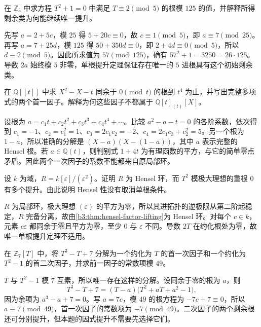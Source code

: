 \begin{optionalexercise}\label{b3:ex:23-five-adic-root}
	在 \(\mathbb Z_5\) 中求方程 \(T^2+1=0\) 中满足 \(T\equiv2\pmod5\) 的根模 \(125\) 的值，并解释所得剩余类为何能继续唯一提升。
\end{optionalexercise}
\begin{solution}
	先写 \(a=2+5c\)，模 \(25\) 得 \(5+20c\equiv0\)，故 \(c\equiv1\pmod5\)，即 \(a\equiv7\pmod{25}\)。再写 \(a=7+25d\)，模 \(125\) 得 \(50+350d\equiv0\)，即 \(2+4d\equiv0\pmod5\)，所以 \(d\equiv2\pmod5\)。因此所求值为 \(57\pmod{125}\)，确有 \(57^2+1=3250=26\cdot125\)。导数 \(2a\) 始终模 \(5\) 非零，单根提升定理保证存在唯一的 \(5\) 进根具有这个初始剩余类。
\end{solution}

\begin{optionalexercise}\label{b3:ex:23-series-root-factors}
	在 \(\mathbb Q[\![t]\!]\) 中求 \(X^2-X-t\) 同余于 \(0\pmod t\) 的根到 \(t^4\) 为止，并写出完整多项式的两个首一因子。解释为何这些因子不都属于 \(\mathbb Q[t]_{(t)}[X]\)。
\end{optionalexercise}
\begin{solution}
	设根为 \(a=c_1t+c_2t^2+c_3t^3+c_4t^4+\cdots\)。比较 \(a^2-a-t=0\) 的各阶系数，依次得到 \(c_1=-1\)、\(c_2=c_1^2=1\)、\(c_3=2c_1c_2=-2\)、\(c_4=2c_1c_3+c_2^2=5\)。另一个根为 \(1-a\)，所以准确的分解是 \((X-a)(X-(1-a))\)，其中 \(a\) 表示完整的 Hensel 根。若 \(a\in\mathbb Q(t)\)，则判别式 \(1+4t\) 为有理函数的平方，与它的简单零点矛盾。因此两个一次因子的系数不能都来自原局部环。
\end{solution}

\begin{optionalexercise}\label{b3:ex:23-repeated-root-henselian}
	设 \(k\) 为域，\(R=k[\varepsilon]/(\varepsilon^2)\)。证明 \(R\) 为 Hensel 环，而 \(T^2\) 模极大理想的重根 \(0\) 有多个提升。由此说明 Hensel 性没有取消单根条件。
\end{optionalexercise}
\begin{solution}
	\(R\) 为局部环，极大理想 \((\varepsilon)\) 的平方为零，所以其进拓扑的逆极限从第二阶起稳定，\(R\) 完备分离，故由\cref{b3:thm:hensel-factor-lifting}为 Hensel 环。对每个 \(c\in k\)，元素 \(c\varepsilon\) 都同余于零且平方为零，至少 \(0\) 与 \(\varepsilon\) 不同。导数 \(2T\) 在约化根处为零，故唯一单根提升定理不适用。
\end{solution}

\begin{optionalexercise}\label{b3:ex:23-cubic-hensel-factor}
	在 \(\mathbb Z_7[T]\) 中，将 \(T^3-T+7\) 分解为一个约化为 \(T\) 的首一次因子和一个约化为 \(T^2-1\) 的首二次因子，并求前一因子的常数项模 \(49\)。
\end{optionalexercise}
\begin{solution}
	\(T\) 与 \(T^2-1\) 模 \(7\) 互素，所以唯一存在这样的分解。设同余于零的根为 \(a\)，则
	\[
		T^3-T+7=(T-a)\bigl(T^2+aT+a^2-1\bigr),
	\]
	因为余项为 \(a^3-a+7=0\)。写 \(a=7c\)，模 \(49\) 的根方程为 \(-7c+7\equiv0\)，所以 \(a\equiv7\pmod{49}\)，首一次因子的常数项为 \(-7\pmod{49}\)。二次因子的两个剩余根还可分别提升，但本题的因式提升不需要先选择它们。
\end{solution}

